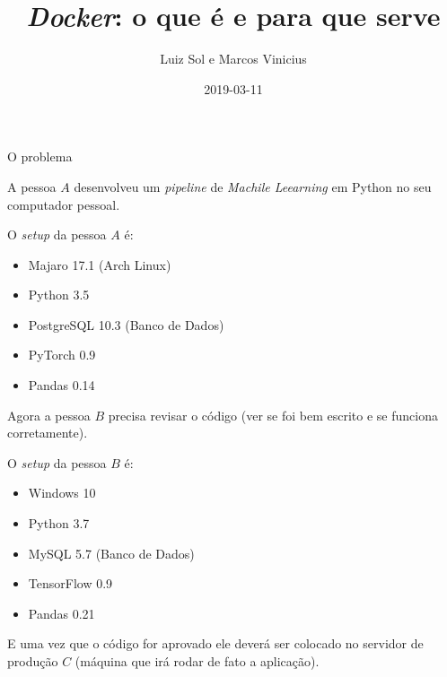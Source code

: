 \documentclass[
  ignorenonframetext,
]{beamer}
\title{\emph{Docker}: o que é e para que serve}
\author{Luiz Sol e Marcos Vinicius}
\date{2019-03-11}
\providecommand{\tightlist}{%
  \setlength{\itemsep}{0pt}\setlength{\parskip}{0pt}}
\begin{document}
\frame{\titlepage}

\begin{frame}{O problema}
\protect\hypertarget{o-problema}{}

A pessoa \(A\) desenvolveu um \emph{pipeline} de \emph{Machile
Leearning} em Python no seu computador pessoal.

\end{frame}

\begin{frame}

O \emph{setup} da pessoa \(A\) é:

\begin{itemize}
\tightlist
\item
  Majaro 17.1 (Arch Linux)
\item
  Python 3.5
\item
  PostgreSQL 10.3 (Banco de Dados)
\item
  PyTorch 0.9
\item
  Pandas 0.14
\end{itemize}

\end{frame}

\begin{frame}

Agora a pessoa \(B\) precisa revisar o código (ver se foi bem escrito e
se funciona corretamente).

\end{frame}

\begin{frame}

O \emph{setup} da pessoa \(B\) é:

\begin{itemize}
\tightlist
\item
  Windows 10
\item
  Python 3.7
\item
  MySQL 5.7 (Banco de Dados)
\item
  TensorFlow 0.9
\item
  Pandas 0.21
\end{itemize}

\end{frame}

\begin{frame}

E uma vez que o código for aprovado ele deverá ser colocado no servidor
de produção \(C\) (máquina que irá rodar de fato a aplicação).

\end{frame}
\end{document}
